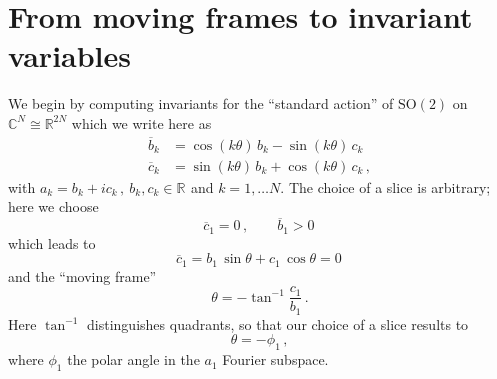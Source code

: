 \documentclass[aip,cha,showpacs,reprint]{revtex4-1} %
\newcommand{\beq}{\begin{equation}}
\newcommand{\eeq}{\end{equation}}
\newcommand{\bseq}{\begin{subequations}}
\newcommand{\eseq}{\end{subequations}}
\newcommand{\barr}{\begin{array}}
\newcommand{\earr}{\end{array}}
\newcommand{\Rls}[1]{\ensuremath{\mathbb{R}^{#1}}}
\newcommand{\Clx}[1]{\ensuremath{\mathbb{C}^{#1}}}
\newcommand{\SOn}[1]{\ensuremath{\textrm{SO}(#1)}}         %
\begin{document}
\section{From moving frames to invariant variables}

We begin by computing invariants for the ``standard action''
of $\SOn{2}$ on $\Clx{N}\cong\Rls{2N}$
which we write here as
\bseq\label{eq:SO2stand}
  \begin{align}
	  \overline{b}_k &= \cos(k\theta)\,b_k - \sin(k\theta)\,c_k\,\label{eq:SO2stand1}\\
	  \overline{c}_k &= \sin(k\theta)\,b_k + \cos(k\theta)\,c_k\,,\label{eq:SO2stand2}
  \end{align}
\eseq
with $a_k=b_k+i c_k\,,\ b_k,c_k\in\Rls{}$ and $k=1,\ldots N$.
The choice of a slice is arbitrary; here we choose
\beq
 	\overline{c}_1=0\,,\qquad \overline{b}_1>0\,
\eeq
{}
which leads to
\beq
	\overline{c}_1 = b_1\,\sin\theta + c_1\,\cos\theta  = 0\,
	\label{eq:SO2norm}
\eeq
and the ``moving frame''
\beq
	\theta=-\tan^{-1}\frac{c_1}{b_1}\,.
	\label{eq:SO2mf}
\eeq
Here $\tan^{-1}$ distinguishes quadrants, so that our choice of a slice
results to
\beq\label{eq:phi1}
  \theta=-\phi_1\,,
\eeq
where $\phi_1$ the polar angle in the $a_1$ Fourier
subspace.
\end{document}
